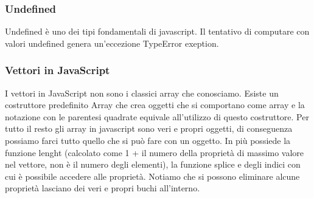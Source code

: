 \subsubsection{Undefined}
Undefined è uno dei tipi fondamentali di javascript. Il tentativo di computare con valori undefined genera un'eccezione TypeError exeption.
\subsubsection{Vettori in JavaScript}
I vettori in JavaScript non sono i classici array che conosciamo. Esiste un costruttore predefinito Array che crea oggetti che si comportano come array e la notazione con le parentesi quadrate equivale all'utilizzo di questo costruttore.\newline
\newline
Per tutto il resto gli array in javascript sono veri e propri oggetti, di conseguenza possiamo farci tutto quello che si può fare con un oggetto. In più possiede la funzione lenght (calcolato come 1 + il numero della proprietà di massimo valore nel vettore, non è il numero degli elementi), la funzione splice e degli indici con cui è possibile accedere alle proprietà. Notiamo che si possono eliminare alcune proprietà lasciano dei veri e propri buchi all'interno.\newline
\newline